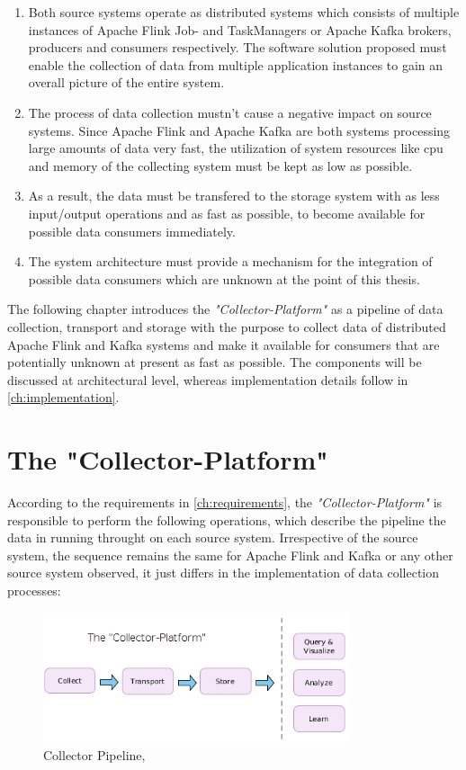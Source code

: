\begin{enumerate}
    \item Both source systems operate as distributed systems which consists of multiple instances of Apache
    Flink Job- and TaskManagers or Apache Kafka brokers, producers and consumers respectively. The software solution proposed
    must enable the collection of data from multiple application instances to gain an overall picture of the entire system.
    \item The process of data collection mustn't cause a negative impact on source systems. Since Apache Flink and Apache Kafka
    are both systems processing large amounts of data very fast, the utilization of system resources like cpu and memory of the
    collecting system must be kept as low as possible.
    \item As a result, the data must be transfered to the storage system with as less input/output operations and as fast
    as possible, to become available for possible data consumers immediately.
    \item The system architecture must provide a mechanism for the integration of possible data consumers which are unknown at
    the point of this thesis.
\end{enumerate}

The following chapter introduces the \textit{"Collector-Platform"} as a pipeline of data collection, transport and storage with the purpose
to collect data of distributed Apache Flink and Kafka systems and make it available for consumers that are potentially unknown at present
as fast as possible. The components will be discussed at architectural level, whereas implementation details follow in \autoref{ch:implementation}.

\section{The "Collector-Platform"}

According to the requirements in \autoref{ch:requirements}, the \textit{"Collector-Platform"} is responsible to perform the
following operations, which describe the pipeline the data in running throught on each source system. Irrespective of the source system,
the sequence remains the same for Apache Flink and Kafka or any other source system observed, it just differs in the implementation of
data collection processes:

\begin{figure}[H]
	\centering
	\includegraphics[width=0.8\textwidth]{../images/06-collect-pipeline.jpg}
	\caption{Collector Pipeline, \cite{VanL14}}
	\label{fig:colletor-pipeline}
\end{figure}

